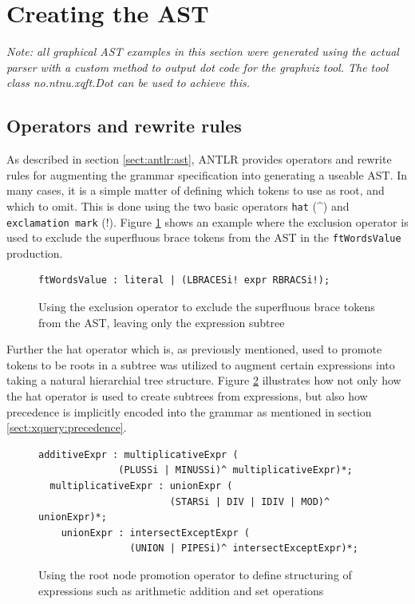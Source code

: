 \section{Creating the AST}
\emph{Note: all graphical AST examples in this section were generated using the
actual parser with a custom method to output dot code for the graphviz tool. The
tool class no.ntnu.xqft.Dot can be used to achieve this.}

\subsection{Operators and rewrite rules}
As described in section \ref{sect:antlr:ast}, ANTLR provides operators and
rewrite rules for augmenting the grammar specification into generating a useable
AST. In many cases, it is a simple matter of defining which tokens to use as
root, and which to omit. This is done using the two basic operators \verb!hat!
(\^{}) and \verb!exclamation mark! (!). Figure \ref{code:ast:exoperator} shows an
example where the exclusion operator is used to exclude the superfluous brace
tokens from the AST in the \verb!ftWordsValue! production.

\begin{figure}[h]
\begin{verbatim}
ftWordsValue : literal | (LBRACESi! expr RBRACSi!);
\end{verbatim}
\caption[AST exclusion operator example]{Using the exclusion operator to exclude
the superfluous brace tokens from the AST, leaving only the expression subtree}
\label{code:ast:exoperator}
\end{figure}

Further the hat operator which is, as previously mentioned, used to promote
tokens to be roots in a subtree was utilized to augment certain expressions into
taking a natural hierarchial tree structure. Figure \ref{code:ast:hatoperator}
illustrates how not only how the hat operator is used to create subtrees from
expressions, but also how precedence is implicitly encoded into the grammar as
mentioned in section \ref{sect:xquery:precedence}.

\begin{figure}[h]
\begin{verbatim}
additiveExpr : multiplicativeExpr (
              (PLUSSi | MINUSSi)^ multiplicativeExpr)*;
  multiplicativeExpr : unionExpr (
                       (STARSi | DIV | IDIV | MOD)^ unionExpr)*;
    unionExpr : intersectExceptExpr (
                (UNION | PIPESi)^ intersectExceptExpr)*;
\end{verbatim}
\caption[AST root node promotion operator example]{Using the root node promotion
operator to define structuring of expressions such as arithmetic addition and set
operations}
\label{code:ast:hatoperator}
\end{figure}

